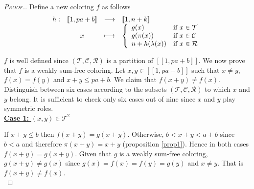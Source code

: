 \begin{proof}[\textsc{Proof.}]
Define a new coloring \(f\) as follows
\[
\begin{array}{c c c l}
	h : & [\![1, p a + b]\!] & \longrightarrow & [\![1,n+k]\!] \\
	& x & \longmapsto & 
	\left\{ \begin{array}{l l}
		g(x) & \text{if}~x \in \mathcal{T} \\
		g(\pi(x)) & \text{if}~x \in \mathcal{C} \\
		n + h(\lambda(x)) & \text{if}~x \in \mathcal{R}
	\end{array} \right.
\end{array}
\]

\(f\) is well defined since \((\mathcal{T}, \mathcal{C}, \mathcal{R})\) is a partition of  \([\![1, p a + b]\!]\). 
We now prove that \(f\) is a weakly sum-free coloring. Let \(x,y \in [\![1, p a + b]\!]\) such that \(x \neq y\), 
\(f(x) = f(y)\) and \(x+y \leqslant p a+ b\). We claim that \(f(x+y) \neq f(x)\). Distinguish between six cases 
according to the subsets \((\mathcal{T}, \mathcal{C}, \mathcal{R})\) to which \(x\) and \(y\) belong. It is 
sufficient to check only six cases out of nine since \(x\) and \(y\) play symmetric roles. \\

\noindent \underline{\textbf{Case 1:} \((x,y) \in \mathcal{T}^2\)}
\par
If \(x + y \leqslant b\) then \(f(x+y)=g(x+y)\). Otherwise, \(b < x+y < a+b\) since \(b < a\) and 
therefore \(\pi(x + y) = x +y\) (proposition \ref{prop1}). Hence in both cases \(f(x+y)=g(x+y)\). Given that 
\(g\) is a weakly sum-free coloring, \(g(x + y) \neq g(x)\) since \(g(x)=f(x)=f(y)=g(y)\) and \(x \neq y \). That 
is \(f(x + y) \neq f(x)\). \\


\end{proof}
